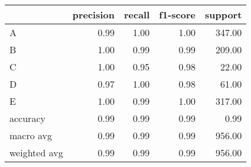 \begin{tabular}{|l|r|r|r|r|}
\hline
{} &  precision &  recall &  f1-score &  support \\
\hline
A            &       0.99 &    1.00 &      1.00 &   347.00 \\
B            &       1.00 &    0.99 &      0.99 &   209.00 \\
C            &       1.00 &    0.95 &      0.98 &    22.00 \\
D            &       0.97 &    1.00 &      0.98 &    61.00 \\
E            &       1.00 &    0.99 &      1.00 &   317.00 \\
accuracy     &       0.99 &    0.99 &      0.99 &     0.99 \\
macro avg    &       0.99 &    0.99 &      0.99 &   956.00 \\
weighted avg &       0.99 &    0.99 &      0.99 &   956.00 \\
\hline
\end{tabular}
